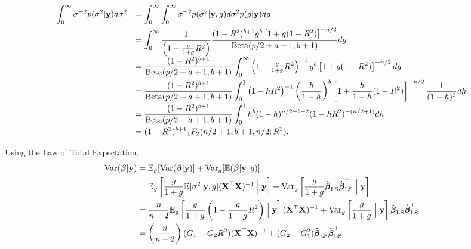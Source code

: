 \documentclass{amsart}[12pt]
\newcommand{\mgc}[1]{{\color{blue}#1}}
\begin{document}
$$
\begin{array}{rl}
	\ds \int_0^\infty \sigma^{-2} p(\sigma^2|\vy) d\sigma^2 
	  & \ds = \int_0^\infty \int_0^\infty \sigma^{-2} p(\sigma^2|\vy,g) d\sigma^2 p(g|\vy) dg 
	\\ [2ex]
	  & \ds =  \int_0^\infty \frac{1}{\left(                                                  
	1 -
	\tfrac{g}{1+g} R^2\right)} \frac{(1 -  R^2)^{b+1} g^{b} \left[  1 + g(1 -  R^2) \right]^{-n/2}}{\mbox{Beta}(p/2 + a + 1,b+1)} dg
	\\ [2ex]
	  & \ds =  \frac{(1 -  R^2)^{b+1}}{\mbox{Beta}(p/2 + a + 1,b+1)}                          
	\int_0^\infty \left( 
	1 -
	\tfrac{g}{1+g} R^2\right)^{-1} g^{b} \left[  1 + g(1 -  R^2) \right]^{-n/2}dg
	\\ [2ex]
	  & \ds =  \frac{(1 -  R^2)^{b+1}}{\mbox{Beta}(p/2 + a + 1,b+1)}                          
	\int_0^1 \left( 
	1 -
	h R^2\right)^{-1} \left( \frac{h}{1 - h}\right)^{b} \left[  1 + \frac{h}{1 - h}(1 -  R^2) \right]^{-n/2} \frac{1}{(1 - h)^2} dh
	
	
	\\ [2ex]
	    
	  & \ds =  \frac{(1 -  R^2)^{b+1}}{\mbox{Beta}(p/2 + a + 1,b+1)}                          
	\int_0^1  h^b (1 - h)^{n/2 - b - 2} ( 1 -  hR^2)^{-(n/2+1)}  dh
	    
	    
	\\ [2ex]
	  & \ds =  (1 -  R^2)^{b+1}                                                               
	{}_1 F_2(n/2+1,b+1,n/2;R^2)  .
\end{array}
$$





Using the Law of Total Expectation,
\begin{align*}
	\text{Var}({\boldsymbol \beta} | {\bf y}) & = \mathbb{E}_g[\text{Var}({\boldsymbol \beta} | {\bf y})] + \text{Var}_g[\mathbb{E}({\boldsymbol \beta}|{\bf y}, g)]                                                                                                                                                 \\
	                   & = \mathbb{E}_g\left[\frac{g}{1 + g} \mathbb{E}[\sigma^2|{\bf y}, g] ({\bf X}^\top {\bf X})^{-1} \Bigm| {\bf y} \right] + \text{Var}_g\left[\frac{g}{1 + g} \hat{{\boldsymbol \beta}}_{\text{LS}} \hat{{\boldsymbol \beta}}_{\text{LS}}^\top \Bigm| {\bf y} \right]                                   \\
	                   & = \frac{n}{n - 2} \mathbb{E}_g\left[\frac{g}{1 + g} \left(1 - \frac{g}{1 + g} R^2 \right) \Bigm| {\bf y} \right] ({\bf X}^\top {\bf X})^{-1} + \text{Var}_g\left[\frac{g}{1 + g} \Bigm| {\bf y} \right] \hat{{\boldsymbol \beta}}_{\text{LS}} \hat{{\boldsymbol \beta}}_{\text{LS}}^\top \\
	                   & = \left( \frac{n}{n - 2} \right) (G_1 - G_2 R^2) ({\bf X}^\top {\bf X})^{-1} + (G_2 - G_1^2) \hat{{\boldsymbol \beta}}_{\text{LS}} \hat{{\boldsymbol \beta}}_{\text{LS}}^\top                                                                                      
\end{align*}
\end{document}
